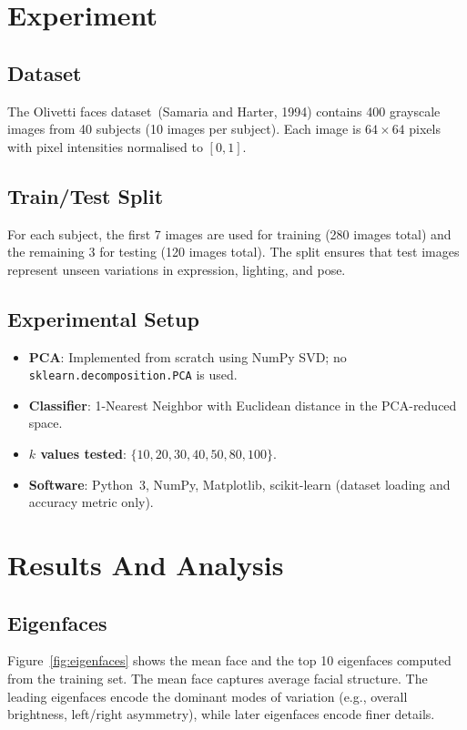 \documentclass[a4paper,fleqn]{cas-sc}
\begin{document}
\section{Experiment}

\subsection{Dataset}
The Olivetti faces dataset~(Samaria and Harter, 1994) contains 400 grayscale images from 40 subjects (10 images per subject). Each image is $64\times64$ pixels with pixel intensities normalised to $[0, 1]$.

\subsection{Train/Test Split}
For each subject, the first 7 images are used for training (280 images total) and the remaining 3 for testing (120 images total). The split ensures that test images represent unseen variations in expression, lighting, and pose.

\subsection{Experimental Setup}
\begin{itemize}
    \item \textbf{PCA}: Implemented from scratch using NumPy SVD; no \texttt{sklearn.decomposition.PCA} is used.
    \item \textbf{Classifier}: 1-Nearest Neighbor with Euclidean distance in the PCA-reduced space.
    \item \textbf{$k$ values tested}: $\{10, 20, 30, 40, 50, 80, 100\}$.
    \item \textbf{Software}: Python~3, NumPy, Matplotlib, scikit-learn (dataset loading and accuracy metric only).
\end{itemize}

\section{Results And Analysis}

\subsection{Eigenfaces}

Figure~\ref{fig:eigenfaces} shows the mean face and the top 10 eigenfaces computed from the training set. The mean face captures average facial structure. The leading eigenfaces encode the dominant modes of variation (e.g., overall brightness, left/right asymmetry), while later eigenfaces encode finer details.
\end{document}
